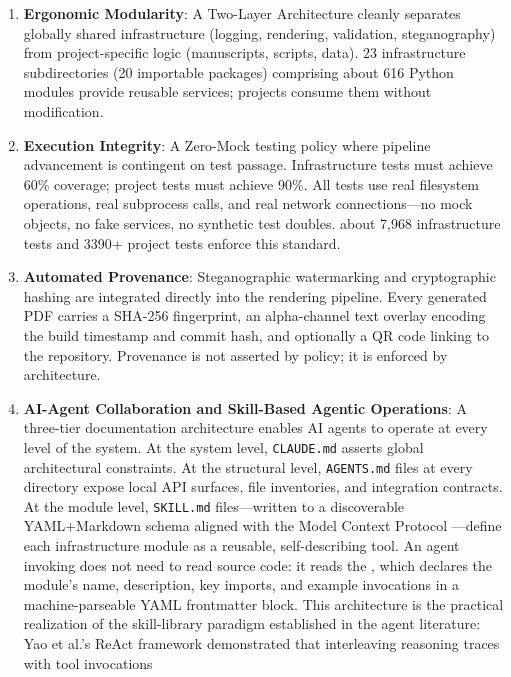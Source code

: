 \documentclass[
]{article}
\begin{document}
\begin{enumerate}
\def\labelenumi{\arabic{enumi}.}
\item
  \textbf{Ergonomic Modularity}: A Two-Layer Architecture cleanly
  separates globally shared infrastructure (logging, rendering,
  validation, steganography) from project-specific logic (manuscripts,
  scripts, data). 23 infrastructure subdirectories (20 importable
  packages) comprising about 616 Python modules provide
  reusable services; projects consume them without modification.
\item
  \textbf{Execution Integrity}: A Zero-Mock testing policy where
  pipeline advancement is contingent on test passage. Infrastructure
  tests must achieve 60\% coverage; project tests must achieve 90\%. All
  tests use real filesystem operations, real subprocess calls, and real
  network connections---no mock objects, no fake services, no synthetic
  test doubles. about 7,968 infrastructure tests and 3390+
  project tests enforce this standard.
\item
  \textbf{Automated Provenance}: Steganographic watermarking and
  cryptographic hashing are integrated directly into the rendering
  pipeline. Every generated PDF carries a SHA-256 fingerprint, an
  alpha-channel text overlay encoding the build timestamp and commit
  hash, and optionally a QR code linking to the repository. Provenance
  is not asserted by policy; it is enforced by architecture.
\item
  \textbf{AI-Agent Collaboration and Skill-Based Agentic Operations}: A
  three-tier documentation architecture enables AI agents to operate at
  every level of the system. At the system level, \texttt{CLAUDE.md}
  asserts global architectural constraints. At the structural level,
  \texttt{AGENTS.md} files at every directory expose local API surfaces,
  file inventories, and integration contracts. At the module level,
  \texttt{SKILL.md} files---written to a discoverable YAML+Markdown
  schema aligned with the Model Context Protocol
  \citep{anthropic2024mcp}---define each infrastructure module as a
  reusable, self-describing tool. An agent invoking
   does not need to read source code:
  it reads the , which declares the module's
  name, description, key imports, and example invocations in a
  machine-parseable YAML frontmatter block. This architecture is the
  practical realization of the skill-library paradigm established in the
  agent literature: Yao et al.'s ReAct framework \citep{yao2023react}
  demonstrated that interleaving reasoning traces with tool invocations

\end{enumerate}
\end{document}
